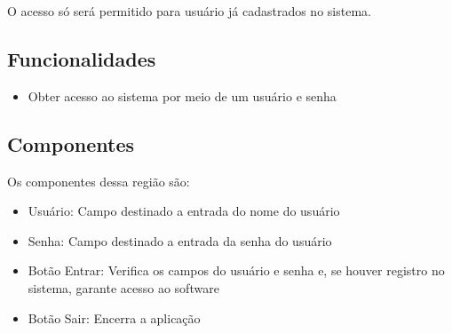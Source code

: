 \documentclass[
	article,			%
	12pt,				%
	oneside,			%
	a4paper,			%
	english,			%
	brazil,				%
	sumario=tradicional
	]{abntex2}
\begin{document}
		O acesso só será permitido para usuário já cadastrados no sistema.
		\subsection{Funcionalidades}
		\begin{itemize}
			\item Obter acesso ao sistema por meio de um usuário e senha
		\end{itemize}
		\subsection{Componentes}
		Os componentes dessa região são:
		\begin{itemize}\itemsep1.5pt	
			\item Usuário: Campo destinado a entrada do nome do usuário
			\item Senha: Campo destinado a entrada da senha do usuário	
			\item Botão Entrar: Verifica os campos do usuário e senha e, se houver registro no sistema, garante acesso ao software	
			\item Botão Sair: Encerra a aplicação	
		\end{itemize}
\end{document}
